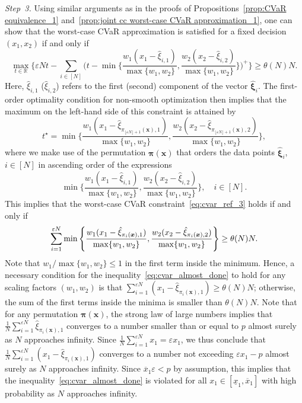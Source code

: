 \documentclass[nonblindrev]{informs2017}
\newcommand{\bmh}[1]{\hat{\bm{#1}}}
\newcommand{\1}[1]{\mathds{1}{\left(#1\right)}}
\begin{document}
{\em Step~3.} 
Using similar arguments as in the proofs of Propositions~\ref{prop:CVaR equivalence_1} and~\ref{prop:joint cc worst-case CVaR approximation_1}, one can show that the worst-case CVaR approximation is satisfied for a fixed decision $(x_1, x_2)$ if and only if
\begin{equation}\label{eq:cvar_ref_3}
\max_{t \in \mathbb{R}} \Bigg\{\varepsilon N t - \sum_{i \in [N]} \Bigg(t - \min \Bigg\{\dfrac{w_1(x_1 - \hat{\xi}_{i,1})}{\max \{w_1, w_2\}}, \dfrac{w_2(x_2 - \hat{\xi}_{i,2})}{\max \{w_1, w_2\}} \Bigg\}\Bigg)^+ \Bigg\} \geq \theta(N) N.
\end{equation}
Here, $\hat{\xi}_{i,1}$ ($\hat{\xi}_{i,2}$) refers to the first (second) component of the vector $\bmh{\xi}_i$. The first-order optimality condition for non-smooth optimization then implies that the maximum on the left-hand side of this constraint is attained by 
$$
t^\star = \min \Bigg\{\dfrac{w_1(x_1 - \hat{\xi}_{\pi_{\lfloor \varepsilon N \rfloor + 1} (\bm{x}), 1})}{\max \{w_1, w_2\}}, \dfrac{w_2(x_2 - \hat{\xi}_{\pi_{\lfloor \varepsilon N \rfloor + 1} (\bm{x}), 2})}{\max \{w_1, w_2\}}\Bigg\},
$$
where we make use of the permutation $\bm{\pi} (\bm{x})$ that orders the data points $\bmh{\xi}_i$, $ i \in [N]$ in ascending order of the expressions
$$
\min \Bigg\{\dfrac{w_1(x_1 - \hat{\xi}_{i,1})}{\max \{w_1,w_2\}}, \dfrac{w_2(x_2 - \hat{\xi}_{i,2})}{\max \{w_1,w_2\}}\Bigg\}, \quad i \in [N].
$$
This implies that the worst-case CVaR constraint~\eqref{eq:cvar_ref_3} holds if and only if
\begin{equation}\label{eq:cvar_almost_done}
\displaystyle \sum_{i = 1}^{\varepsilon N}\min \Bigg\{\dfrac{w_1(x_1 - \hat{\xi}_{\pi_i (\bm{x}),1})}{\max \{w_1, w_2\}}, \dfrac{w_2(x_2 - \hat{\xi}_{\pi_i (\bm{x}),2})}{\max \{w_1, w_2\}}\Bigg\} \geq \theta(N) N. \\
\end{equation}
Note that $w_1 / \max \{ w_1, w_2 \} \leq 1$ in the first term inside the minimum. Hence, a necessary condition for the inequality~\eqref{eq:cvar_almost_done} to hold for any scaling factors $(w_1, w_2)$ is that $\sum_{i = 1}^{\varepsilon N} (x_1 - \hat{\xi}_{\pi_i (\bm{x}),1}) \geq \theta(N) N$; otherwise, the sum of the first terms inside the minima is smaller than $\theta(N) N$. Note that for any permutation $\bm{\pi} (\bm{x})$, the strong law of large numbers implies that $\frac{1}{N}\sum_{i = 1}^{\varepsilon N} \hat{\xi}_{\pi_i (\bm{x}),1}$ converges to a number smaller than or equal to $p$ almost surely as $N$ approaches infinity. Since $\frac{1}{N}\sum_{i = 1}^{\varepsilon N} x_1 = \varepsilon x_1$, we thus conclude that $\frac{1}{N}\sum_{i = 1}^{\varepsilon N} (x_1 - \hat{\xi}_{\pi_i (\bm{x}),1})$ converges to a number not exceeding $\varepsilon x_1 - p$ almost surely as $N$ approaches infinity. Since $\overline{x}_1 \varepsilon < p$ by assumption, this implies that the inequality~\eqref{eq:cvar_almost_done} is violated for all $x_1 \in [\underline{x}_1, \overline{x}_1]$ with high probability as $N$ approaches infinity.
\hfill \Halmos
\endproof
\end{document}
